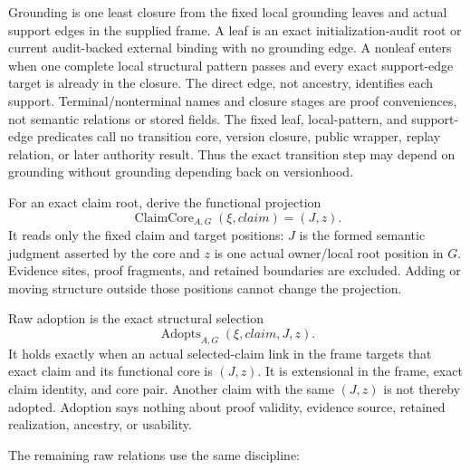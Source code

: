 \documentclass[11pt,twoside]{article}
\begin{document}
Grounding is one least closure from the fixed local grounding leaves and actual
support edges in the supplied frame.  A leaf is an exact initialization-audit root
or current audit-backed external binding with no grounding edge.  A nonleaf enters
when one complete local structural pattern passes and every exact support-edge
target is already in the closure.  The direct edge, not ancestry, identifies each
support.  Terminal/nonterminal names and closure stages are proof conveniences,
not semantic relations or stored fields.
The fixed leaf, local-pattern, and support-edge predicates call no transition core,
version closure, public wrapper, replay relation, or later authority result.  Thus
the exact transition step may depend on grounding without grounding depending back
on versionhood.

For an exact claim root, derive the functional projection
\[
  \operatorname{ClaimCore}_{A,G}(\xi,\mathit{claim})=(J,z).
\]
It reads only the fixed claim and target positions: \(J\) is the formed semantic
judgment asserted by the core and \(z\) is one actual owner/local root position in
\(G\).  Evidence sites, proof fragments, and retained boundaries are excluded.
Adding or moving structure outside those positions cannot change the projection.

Raw adoption is the exact structural selection
\[
  \operatorname{Adopts}_{A,G}(\xi,\mathit{claim},J,z).
\]
It holds exactly when an actual selected-claim link in the frame targets that exact
claim and its functional core is \((J,z)\).  It is extensional in the frame, exact
claim identity, and core pair.  Another claim with the same \((J,z)\) is not thereby
adopted.  Adoption says nothing about proof validity, evidence source, retained
realization, ancestry, or usability.

The remaining raw relations use the same discipline:
\end{document}
